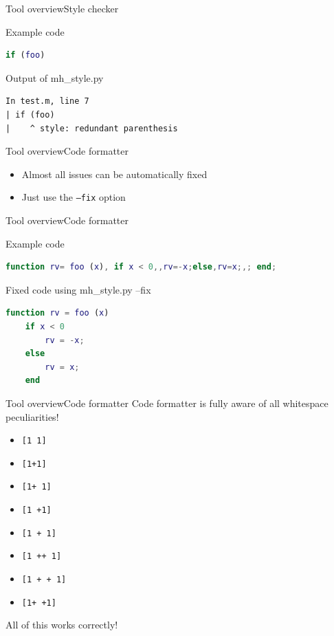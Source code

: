 \documentclass{beamer}
\begin{document}
\begin{frame}[fragile]{Tool overview}{Style checker}
  \begin{block}{Example code}
\begin{lstlisting}[language=MATLAB]
if (foo)
\end{lstlisting}
  \end{block}
  \pause
  \begin{block}{Output of mh\_style.py}
    \scriptsize
\begin{verbatim}
In test.m, line 7
| if (foo)
|    ^ style: redundant parenthesis
\end{verbatim}
  \end{block}
\end{frame}

\begin{frame}{Tool overview}{Code formatter}
  \begin{itemize}
  \item Almost all issues can be automatically fixed
  \item Just use the {\tt --fix} option
  \end{itemize}
\end{frame}

\begin{frame}[fragile]{Tool overview}{Code formatter}
  \begin{block}{Example code}
\begin{lstlisting}[language=MATLAB]
function rv= foo (x), if x < 0,,rv=-x;else,rv=x;,; end;
\end{lstlisting}
  \end{block}
  \pause
  \begin{block}{Fixed code using mh\_style.py --fix}
\begin{lstlisting}[language=MATLAB]
function rv = foo (x)
    if x < 0
        rv = -x;
    else
        rv = x;
    end
\end{lstlisting}
  \end{block}
\end{frame}

\begin{frame}[fragile]{Tool overview}{Code formatter}
  Code formatter is fully aware of all whitespace peculiarities!
  \pause
  \begin{itemize}
  \item \verb|[1 1]|
  \item \verb|[1+1]|
  \item \verb|[1+ 1]|
  \item \verb|[1 +1]|
  \item \verb|[1 + 1]|
  \item \verb|[1 ++ 1]|
  \item \verb|[1 + + 1]|
  \item \verb|[1+ +1]|
  \end{itemize}
  All of this works correctly!
\end{frame}
\end{document}
